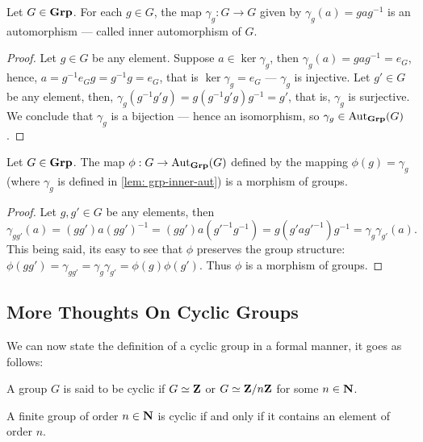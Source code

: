 \begin{lemma}\label{lem: grp-inner-aut}
Let \(G \in {\textbf{Grp}}\). For each \(g \in G\), the map \(\gamma_g: G \to G\) given
by \(\gamma_g(a) = gag^{-1}\) is an automorphism --- called inner
automorphism of \(G\).
\end{lemma}

\begin{proof}
Let \(g \in G\) be any element. Suppose \(a \in \ker\gamma_g\), then
\(\gamma_g(a) = gag^{-1} = e_G\), hence, \(a = g^{-1} e_G g = g^{-1}g = e_G\),
that is \(\ker\gamma_g = e_G\) --- \(\gamma_g\) is injective. Let \(g' \in G\)
be any element, then, \(\gamma_g(g^{-1} g' g) = g (g^{-1} g' g) g^{-1} = g'\),
that is, \(\gamma_g\) is surjective. We conclude that \(\gamma_g\) is a
bijection --- hence an isomorphism, so \(\gamma_g \in \operatorname{Aut}_{\textbf{Grp}}(G)\).
\end{proof}

\begin{lemma}\label{lem: grp-inner-aut-cor}
Let \(G \in {\textbf{Grp}}\). The map \(\phi: G \to \operatorname{Aut}_{\textbf{Grp}}(G)\) defined by the
mapping \(\phi(g) = \gamma_g\) (where \(\gamma_g\) is defined in \cref{lem:
grp-inner-aut}) is a morphism of groups.
\end{lemma}

\begin{proof}
Let \(g, g' \in G\) be any elements, then
\[
  \gamma_{gg'}(a) = (gg')a{(gg')}^{-1} = (g g') a (g'^{-1} g^{-1})
  = g(g' a g'^{-1}) g^{-1} = \gamma_g \gamma_{g'}(a).
\]
This being said, its easy to see that \(\phi\) preserves the group structure:
\(\phi(gg') = \gamma_{gg'} = \gamma_g \gamma_{g'} = \phi(g) \phi(g')\). Thus
\(\phi\) is a morphism of groups.
\end{proof}


\subsection{More Thoughts On Cyclic Groups}

We can now state the definition of a cyclic group in a formal manner, it goes as
follows:

\begin{definition}\label{def: cyclic-grp}
A group \(G\) is said to be cyclic if \(G \simeq \mathbf{Z}\) or \(G \simeq \mathbf{Z}/n\mathbf{Z}\) for
some \(n \in \mathbf{N}\).
\end{definition}

\begin{proposition}
A finite group of order \(n \in \mathbf{N}\) is cyclic if and only if it contains an
element of order \(n\).
\end{proposition}

